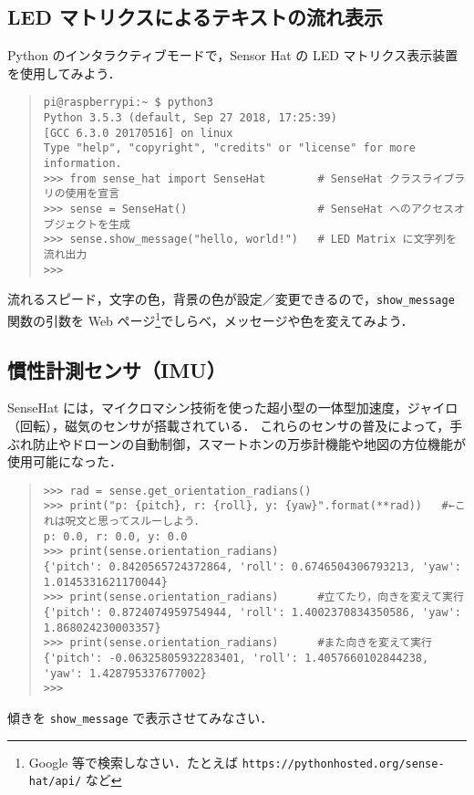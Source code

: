\documentclass[11pt,a4,epsf]{report}
\begin{document}
\subsection{LED マトリクスによるテキストの流れ表示}

Python のインタラクティブモードで，Sensor Hat の LED マトリクス表示装置を使用してみよう．
\begin{quote}
\small
\begin{verbatim}
pi@raspberrypi:~ $ python3
Python 3.5.3 (default, Sep 27 2018, 17:25:39) 
[GCC 6.3.0 20170516] on linux
Type "help", "copyright", "credits" or "license" for more information.
>>> from sense_hat import SenseHat        # SenseHat クラスライブラリの使用を宣言
>>> sense = SenseHat()                    # SenseHat へのアクセスオブジェクトを生成
>>> sense.show_message("hello, world!")   # LED Matrix に文字列を流れ出力
>>> 
\end{verbatim}
\end{quote}

\begin{excercise}
流れるスピード，文字の色，背景の色が設定／変更できるので，\verb+show_message+ 関数の引数を Web ページ\footnote{Google 等で検索しなさい．たとえば {\tt https://pythonhosted.org/sense-hat/api/} など}でしらべ，メッセージや色を変えてみよう．
\end{excercise}

\subsection{慣性計測センサ（IMU）}

SenseHat には，マイクロマシン技術を使った超小型の一体型加速度，ジャイロ（回転），磁気のセンサが搭載されている．
これらのセンサの普及によって，手ぶれ防止やドローンの自動制御，スマートホンの万歩計機能や地図の方位機能が使用可能になった．
\begin{quote}
\small
\begin{verbatim}
>>> rad = sense.get_orientation_radians()
>>> print("p: {pitch}, r: {roll}, y: {yaw}".format(**rad))   #←これは呪文と思ってスルーしよう．
p: 0.0, r: 0.0, y: 0.0
>>> print(sense.orientation_radians)
{'pitch': 0.8420565724372864, 'roll': 0.6746504306793213, 'yaw': 1.0145331621170044}
>>> print(sense.orientation_radians)      #立てたり，向きを変えて実行
{'pitch': 0.8724074959754944, 'roll': 1.4002370834350586, 'yaw': 1.868024230003357}
>>> print(sense.orientation_radians)      #また向きを変えて実行
{'pitch': -0.06325805932283401, 'roll': 1.4057660102844238, 'yaw': 1.428795337677002}
>>> 
\end{verbatim}
\end{quote}

\begin{excercise}
傾きを \verb+show_message+ で表示させてみなさい．
\end{excercise}
\end{document}
